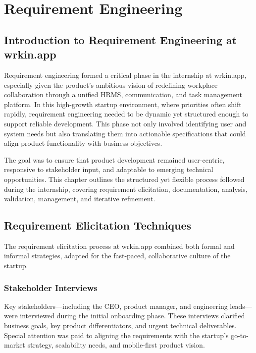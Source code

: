 \chapter{Requirement Engineering}

\section{Introduction to Requirement Engineering at wrkin.app}

Requirement engineering formed a critical phase in the internship at wrkin.app, especially given the product's ambitious vision of redefining workplace collaboration through a unified HRMS, communication, and task management platform. In this high-growth startup environment, where priorities often shift rapidly, requirement engineering needed to be dynamic yet structured enough to support reliable development. This phase not only involved identifying user and system needs but also translating them into actionable specifications that could align product functionality with business objectives.

The goal was to ensure that product development remained user-centric, responsive to stakeholder input, and adaptable to emerging technical opportunities. This chapter outlines the structured yet flexible process followed during the internship, covering requirement elicitation, documentation, analysis, validation, management, and iterative refinement.

\section{Requirement Elicitation Techniques}

The requirement elicitation process at wrkin.app combined both formal and informal strategies, adapted for the fast-paced, collaborative culture of the startup.

\subsection{Stakeholder Interviews}

Key stakeholders—including the CEO, product manager, and engineering leads—were interviewed during the initial onboarding phase. These interviews clarified business goals, key product differentiators, and urgent technical deliverables. Special attention was paid to aligning the requirements with the startup's go-to-market strategy, scalability needs, and mobile-first product vision.

